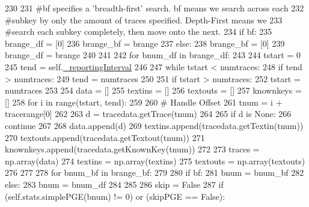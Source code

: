 \begin{DoxyCode}
{{230 
231         \textcolor{comment}{#bf specifies a 'breadth-first' search. bf means we search across each}
232         \textcolor{comment}{#subkey by only the amount of traces specified. Depth-First means we}
233         \textcolor{comment}{#search each subkey completely, then move onto the next.}
234         \textcolor{keywordflow}{if} bf:
235             brange\_df = [0]
236             brange\_bf = brange
237         \textcolor{keywordflow}{else}:
238             brange\_bf = [0]
239             brange\_df = brange
240 
241 
242         \textcolor{keywordflow}{for} bnum\_df \textcolor{keywordflow}{in} brange\_df:
243 
244             tstart = 0
245             tend = self.\hyperlink{classsoftware_1_1chipwhisperer_1_1analyzer_1_1attacks_1_1cpa__algorithms_1_1progressive__caccel_1_1CPAProgressive__CAccel_aeeada041496f41516cf4b3effe6a8b36}{\_reportingInterval}
246 
247             \textcolor{keywordflow}{while} tstart < numtraces:
248                 \textcolor{keywordflow}{if} tend > numtraces:
249                     tend = numtraces
250 
251                 \textcolor{keywordflow}{if} tstart > numtraces:
252                     tstart = numtraces
253 
254                 data = []
255                 textins = []
256                 textouts = []
257                 knownkeys = []
258                 \textcolor{keywordflow}{for} i \textcolor{keywordflow}{in} range(tstart, tend):
259 
260                     \textcolor{comment}{# Handle Offset}
261                     tnum = i + tracerange[0]
262 
263                     d = tracedata.getTrace(tnum)
264 
265                     \textcolor{keywordflow}{if} d \textcolor{keywordflow}{is} \textcolor{keywordtype}{None}:
266                         \textcolor{keywordflow}{continue}
267 
268                     data.append(d)
269                     textins.append(tracedata.getTextin(tnum))
270                     textouts.append(tracedata.getTextout(tnum))
271                     knownkeys.append(tracedata.getKnownKey(tnum))
272 
273                 traces = np.array(data)
274                 textins = np.array(textins)
275                 textouts = np.array(textouts)
276 
277 
278                 \textcolor{keywordflow}{for} bnum\_bf \textcolor{keywordflow}{in} brange\_bf:
279 
280                     \textcolor{keywordflow}{if} bf:
281                         bnum = bnum\_bf
282                     \textcolor{keywordflow}{else}:
283                         bnum = bnum\_df
284 
285 
286                     skip = \textcolor{keyword}{False}
287                     \textcolor{keywordflow}{if} (self.stats.simplePGE(bnum) != 0) \textcolor{keywordflow}{or} (skipPGE == \textcolor{keyword}{False}):
}}
\end{DoxyCode}
